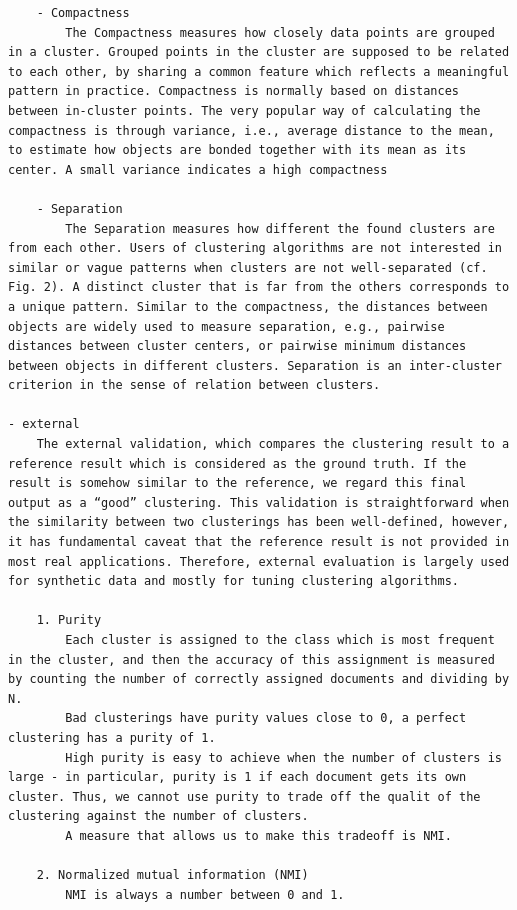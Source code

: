 \documentclass[
]{book}
\begin{document}
\begin{verbatim}
    - Compactness
        The Compactness measures how closely data points are grouped in a cluster. Grouped points in the cluster are supposed to be related to each other, by sharing a common feature which reflects a meaningful pattern in practice. Compactness is normally based on distances between in-cluster points. The very popular way of calculating the compactness is through variance, i.e., average distance to the mean, to estimate how objects are bonded together with its mean as its center. A small variance indicates a high compactness 

    - Separation
        The Separation measures how different the found clusters are from each other. Users of clustering algorithms are not interested in similar or vague patterns when clusters are not well-separated (cf. Fig. 2). A distinct cluster that is far from the others corresponds to a unique pattern. Similar to the compactness, the distances between objects are widely used to measure separation, e.g., pairwise distances between cluster centers, or pairwise minimum distances between objects in different clusters. Separation is an inter-cluster criterion in the sense of relation between clusters.

- external
    The external validation, which compares the clustering result to a reference result which is considered as the ground truth. If the result is somehow similar to the reference, we regard this final output as a “good” clustering. This validation is straightforward when the similarity between two clusterings has been well-defined, however, it has fundamental caveat that the reference result is not provided in most real applications. Therefore, external evaluation is largely used for synthetic data and mostly for tuning clustering algorithms.

    1. Purity
        Each cluster is assigned to the class which is most frequent in the cluster, and then the accuracy of this assignment is measured by counting the number of correctly assigned documents and dividing by N.
        Bad clusterings have purity values close to 0, a perfect clustering has a purity of 1.
        High purity is easy to achieve when the number of clusters is large - in particular, purity is 1 if each document gets its own cluster. Thus, we cannot use purity to trade off the qualit of the clustering against the number of clusters.
        A measure that allows us to make this tradeoff is NMI.

    2. Normalized mutual information (NMI)
        NMI is always a number between 0 and 1.


\end{verbatim}
\end{document}
